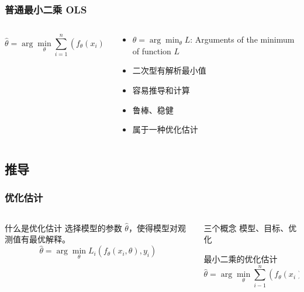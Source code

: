 \documentclass[serif,aspectratio=169]{beamer}
\begin{document}
\begin{frame}
  \frametitle{普通最小二乘 OLS}
  \begin{columns}
    \begin{column}{.5\textwidth}
      $$\hat\theta=\arg\min_{\theta}\sum_{i=1}^n\left(f_{\theta}(x_i)-y_i\right)^2$$

    \end{column}
    
    \begin{column}{.5\textwidth}
      \begin{itemize}
      \item $\displaystyle\hat{\theta}=\arg\min_{\theta}L$: Arguments of the minimum of function $L$
      \item 二次型有解析最小值
      \item 容易推导和计算
      \item 鲁棒、稳健
      \item 属于一种优化估计
      \end{itemize}
    \end{column}
  \end{columns}
\end{frame}


\subsection{推导}
\begin{frame}
  \frametitle{优化估计}
  \begin{columns}
    \begin{column}{.5\textwidth}
      \begin{block}{什么是优化估计}
        \hspace{2em}选择模型的参数 $\hat\theta$，使得模型对观测值有最优解释。
        $$\hat\theta=\arg\min_{\theta}L_i(f_{\theta}(x_i,\theta), y_i)$$
      \end{block}
    \end{column}
    \pause
    \begin{column}{.5\textwidth}
      \begin{block}{三个概念}
        \hspace{2em}模型、目标、优化
      \end{block}
      \begin{block}{最小二乘的优化估计}
        $$\hat\theta=\arg\min_{\theta}\sum_{i-1}^n(f_{\theta}(x_i)-y_i)^2$$
      \end{block}
    \end{column}
  \end{columns}
\end{frame}
\end{document}
